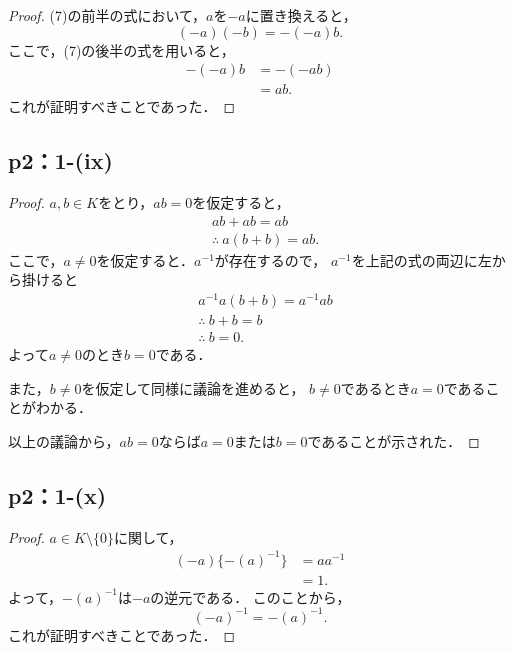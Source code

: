 \documentclass[a4paper,10pt,fleqn]{ltjsarticle}
\begin{document}
\begin{leftbar}
    \begin{proof}
        (7)の前半の式において，$a$を$-a$に置き換えると，
        \[
            (-a)(-b) = -(-a)b.
        \]
        ここで，(7)の後半の式を用いると，
        \begin{align*}
            -(-a)b & = -(-ab) \\
                   & = ab.
        \end{align*}
        これが証明すべきことであった．
    \end{proof}
\end{leftbar}


\subsection*{p2：1-(ix)}

\begin{leftbar}
    \begin{proof}
        $ a, b \in K$をとり，$ab =0$を仮定すると，
        \begin{align*}
             & ab + ab = ab            \\
             & \therefore ~ a(b+b)=ab.
        \end{align*}
        ここで，$a \ne 0$を仮定すると．$a^{-1}$が存在するので，
        $a^{-1}$を上記の式の両辺に左から掛けると
        \begin{align*}
             & a^{-1}a(b+b)=a^{-1}ab \\
             & \therefore ~ b+b=b    \\
             & \therefore ~ b=0.
        \end{align*}
        よって$a \ne 0$のとき$b=0$である．

        また，$b \ne 0$を仮定して同様に議論を進めると，
        $b \ne 0$であるとき$ a=0$であることがわかる．

        以上の議論から，$ab=0$ならば$a=0$または$b=0$であることが示された．
    \end{proof}
\end{leftbar}

\subsection*{p2：1-(x)}

\begin{leftbar}
    \begin{proof}
        $ a \in K \setminus \{ 0 \} $に関して，
        \begin{align*}
            (-a) \{ -(a)^{-1} \} & = aa^{-1} \\
                                 & =1.
        \end{align*}
        よって，$-(a)^{-1}$は$-a$の逆元である．
        このことから，
        \[
            (-a)^{-1} = -(a)^{-1}.
        \]
        これが証明すべきことであった．
    \end{proof}
\end{leftbar}
\end{document}
